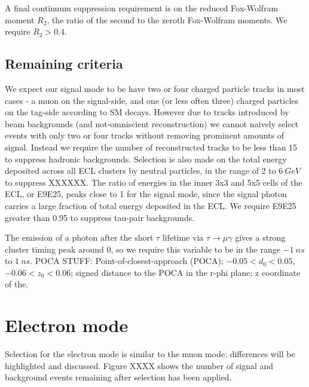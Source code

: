 \documentclass[12pt]{thesis}  %
\begin{document}
A final continuum suppression requirement is on the reduced Fox-Wolfram moment $R_2$, the ratio of the second to the zeroth Fox-Wolfram moments. We require $R_2 > 0.4$.

\subsection{Remaining criteria}

We expect our signal mode to be have two or four charged particle tracks in most cases - a muon on the signal-side, and one (or less often three) charged particles on the tag-side according to SM decays. However due to tracks introduced by beam backgrounds (and not-omniscient reconstruction) we cannot naively select events with only two or four tracks without removing prominent amounts of signal. Instead we require the number of reconstructed tracks to be less than 15 to suppress hadronic backgrounds. Selection is also made on the total energy deposited across all ECL clusters by neutral particles, in the range of 2 to $\SI{6}{GeV}$ to suppress XXXXXX. The ratio of energies in the inner 3x3 and 5x5 cells of the ECL, or E9E25, peaks close to 1 for the signal mode, since the signal photon carries a large fraction of total energy deposited in the ECL. We require E9E25 greater than \num{0.95} to suppress tau-pair backgrounds.

The emission of a photon after the short $\tau$ lifetime via $\tau\to\mu\gamma$ gives a strong cluster timing peak around 0, so we require this variable to be in the range $\SI{-1}{ns}$ to $\SI{1}{ns}$. POCA STUFF: Point-of-closest-approach (POCA); $-0.05 < d_0 < 0.05$, $-0.06 < z_0 < 0.06$; signed distance to the POCA in the r-phi plane; z coordinate of the.


\section{Electron mode}

Selection for the electron mode is similar to the muon mode; differences will be highlighted and discussed. Figure XXXX shows the number of signal and background events remaining after selection has been applied.
\end{document}
